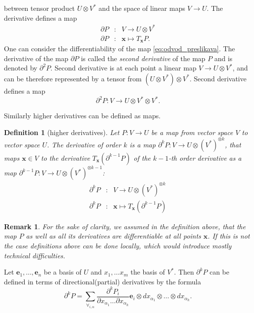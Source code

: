 \documentclass{article}
\newcommand{\e}{\mathbf{e}}
\newcommand{\x}{\mathbf{x}}
\newcommand{\D}{\partial}
\newtheorem{definicija}{Definition}[section]
\newtheorem{opomba}{Remark}[section]
\begin{document}
between tensor product $U\otimes V^*$ and the space of linear maps $V\to U$. The derivative defines a map
\begin{eqnarray}
  \label{eq:odvod_preslikava}
  \D P&:& V\to U\otimes V^*\\
  \D P&:& \x \mapsto T_\x P.
\end{eqnarray}
One can consider the differentiability of the map \eqref{eq:odvod_preslikava}.
The derivative of the map $\D P$ is called the \emph{second derivative}
of the map $P$ and is denoted by $\D^2P$. Second derivative is at each point a
linear map  $V\to U\otimes V^*$, and can be therefore 
represented by a tensor from $(U\otimes V^*)\otimes V^*$. Second derivative
defines a map 
$$\D^2 P:V\to U\otimes V^*\otimes V^*.$$ 

Similarly higher derivatives can be defined as maps.
\begin{definicija}[higher derivatives]
  Let $P:V\to U$ be a map from vector space $V$ to vector space $U$. 
The derivative of order $k$ is a map $\D^kP:V\to U\otimes(V^*)^{\otimes k}$,
that maps $\x\in V$ to the derivative  $T_\x(\D^{k-1}P)$ of the $k-1$-th order
derivative as a map $\D^{k-1}P: V\to U\otimes (V^*)^{\otimes k-1}$:
  \begin{eqnarray}\label{eq:partial}
    \label{eq:visji_odvod}
    \D^kP&:&V\to U\otimes (V^*)^{\otimes k}\\
    \D^kP&:&\x\mapsto T_\x\left( \D^{k-1}P \right)
  \end{eqnarray}
\end{definicija} 
\begin{opomba}
  For the sake of clarity, we assumed in the definition above, that the map $P$ as well as all its
  derivatives are differentiable at all points $\x$. If this is not the case
  definitions above can be done locally, which would introduce mostly technical difficulties.
\end{opomba}
Let $\e_1,\ldots,\e_n$ be a basis of $U$ and $x_1,\ldots x_m$ the basis of
$V^*$. Then $\D^kP$  can be defined in terms of
directional(partial) derivatives by the formula
\begin{equation}\label{eq:d}
	\partial^kP=\sum_{\forall_{i,\alpha}}\frac{\partial^k P_i}{\partial
	    x_{\alpha_1}\ldots \partial x_{\alpha_k}}\e_i\otimes
	  dx_{\alpha_1}\otimes\ldots \otimes dx_{\alpha_k}.
\end{equation}
\end{document}
